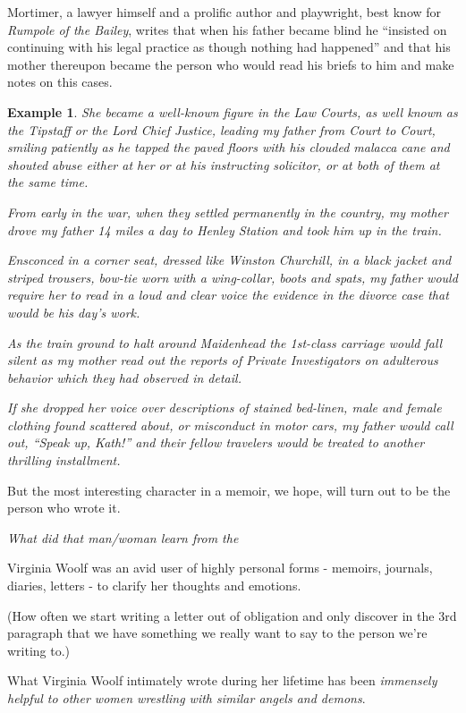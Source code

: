 \documentclass{book}
\numberwithin{equation}{section}
\newtheorem{example}{Example}[chapter]
\begin{document}
Mortimer, a lawyer himself and a prolific author and playwright, best know for \textit{Rumpole of the Bailey}, writes that when his father became blind he ``insisted on continuing with his legal practice as though nothing had happened'' and that his mother thereupon became the person who would read his briefs to him and make notes on this cases.
\begin{example}
    She became a well-known figure in the Law Courts, as well known as the Tipstaff or the Lord Chief Justice, leading my father from Court to Court, smiling patiently as he tapped the paved floors with his clouded malacca cane and shouted abuse either at her or at his instructing solicitor, or at both of them at the same time.
    
    From early in the war, when they settled permanently in the country, my mother drove my father 14 miles a day to Henley Station and took him up in the train.
    
    Ensconced in a corner seat, dressed like Winston Churchill, in a black jacket and striped trousers, bow-tie worn with a wing-collar, boots and spats, my father would require her to read in a loud and clear voice the evidence in the divorce case that would be his day's work.
    
    As the train ground to halt around Maidenhead the 1st-class carriage would fall silent as my mother read out the reports of Private Investigators on adulterous behavior which they had observed in detail.
    
    If she dropped her voice over descriptions of stained bed-linen, male and female clothing found scattered about, or misconduct in motor cars, my father would call out, ``Speak up, Kath!'' and their fellow travelers would be treated to another thrilling installment.
\end{example}
But the most interesting character in a memoir, we hope, will turn out to be the person who wrote it.

\textit{What did that man/woman learn from the }

Virginia Woolf was an avid user of highly personal forms - memoirs, journals, diaries, letters - to clarify her thoughts and emotions.

(How often we start writing a letter out of obligation and only discover in the 3rd paragraph that we have something we really want to say to the person we're writing to.)

What Virginia Woolf intimately wrote during her lifetime has been \textit{immensely helpful to other women wrestling with similar angels and demons}.
\end{document}

